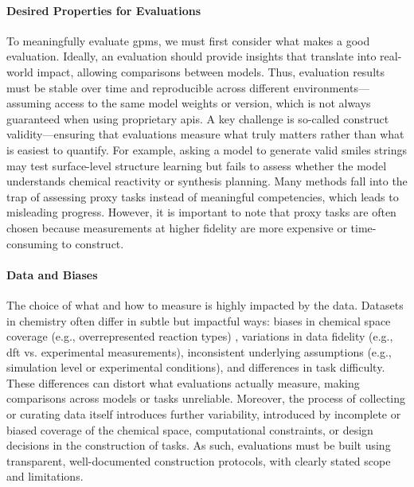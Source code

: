 \documentclass[11pt, oneside]{article}
\providecommand{\DIFaddtex}[1]{{\protect\color{blue}\uwave{#1}}} %
\providecommand{\DIFaddbegin}{} %
\providecommand{\DIFaddend}{} %
\providecommand{\DIFadd}[1]{\texorpdfstring{\DIFaddtex{#1}}{#1}} %
\newcommand{\DIFaddincludegraphics}[2][]{{\color{blue}\fbox{\DIFOincludegraphics[#1]{#2}}}} %
\DeclareRobustCommand{\DIFaddbegin}{\DIFOaddbegin \let\includegraphics\DIFaddincludegraphics} %
\DeclareRobustCommand{\DIFaddend}{\DIFOaddend \let\includegraphics\DIFOincludegraphics} %
\begin{document}
\paragraph{Desired Properties for Evaluations}
To meaningfully evaluate \glspl{gpm}, we must first consider what makes a good evaluation. 
Ideally, an evaluation should provide insights that translate into real-world impact, allowing comparisons between models. 
Thus, evaluation results must be stable over time and reproducible across different environments---assuming access to the same model weights or version, which is not always guaranteed when using proprietary \glspl{api}. \autocite{Ollion2024dangers}
A key challenge is so-called construct validity---ensuring that evaluations measure what truly matters rather than what is easiest to quantify. For example, asking a model to generate valid \gls{smiles} strings may test surface-level structure learning but fails to assess whether the model understands chemical reactivity or synthesis planning.
Many methods fall into the trap of assessing proxy tasks instead of meaningful competencies, which leads to misleading \DIFaddbegin \DIFadd{reports of }\DIFaddend progress. 
However, it is important to note that proxy tasks are often chosen because measurements at higher fidelity are more expensive or time-consuming to construct. 


\paragraph{Data and Biases} The choice of what and how to measure is highly impacted by the data. 
Datasets in chemistry often differ in subtle but impactful ways: biases in chemical space coverage (e.g., overrepresented reaction types) \autocite{Jia_2019anthropogenic,Fujinuma_2022why}, variations in data fidelity (e.g., \gls{dft} vs. experimental measurements),  inconsistent underlying assumptions (e.g., simulation level or experimental conditions), and differences in task difficulty. 
These differences can distort what evaluations actually measure, making comparisons across models or tasks unreliable. \autocite{peng2024survey}
Moreover, the process of collecting or curating data itself introduces further variability, introduced by incomplete or biased coverage of the chemical space, computational constraints, or design decisions in the construction of tasks. 
As such, evaluations must be built using transparent, well-documented construction protocols, with clearly stated scope and limitations.
\end{document}
